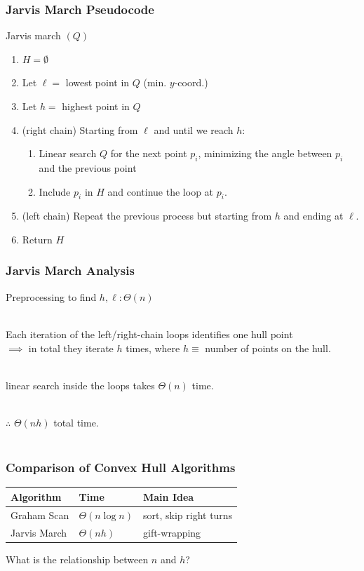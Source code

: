 \documentclass{beamer}
\newcommand{\stanza}{ \\~\ }
\begin{document}
\begin{frame} \frametitle{Jarvis March Pseudocode}
Jarvis march $(Q)$
\begin{enumerate}
  \item $H = \emptyset$
  \item Let $\ell = $ lowest point in $Q$ (min. $y$-coord.)
  \item Let $h = $ highest point in $Q$
  \item (right chain) Starting from $\ell$ and until we reach $h$:
    \begin{enumerate}
      \item Linear search $Q$ for the next point $p_i$, minimizing the angle
        between $p_i$ and the previous point
      \item Include $p_i$ in $H$ and continue the loop at $p_i$.
    \end{enumerate}
  \item (left chain) Repeat the previous process but starting from $h$ and ending at $\ell$.
  \item Return $H$
\end{enumerate}
\end{frame}

\begin{frame} \frametitle{Jarvis March Analysis}
  Preprocessing to find $h, \ell: \Theta(n)$ \stanza

  Each iteration of the left/right-chain loops identifies one hull point \\
  $\implies$ in total they iterate $h$ times,
  where $h \equiv $ number of points on the hull. \stanza

  linear search inside the loops takes $\Theta(n)$ time. \stanza

  $\therefore$ $\Theta(nh)$ total time. \stanza
\end{frame}


\begin{frame} \frametitle{Comparison of Convex Hull Algorithms}
\begin{center}
  \begin{tabular}{|l|l|l|}
    \hline
    \textbf{Algorithm} & \textbf{Time} & \textbf{Main Idea} \\ \hline
    Graham Scan & $\Theta(n \log n)$ & sort, skip right turns \\
    Jarvis March & $\Theta(nh)$ & gift-wrapping \\
    \hline
  \end{tabular}
\end{center}
\vspace{.5cm}
What is the relationship between $n$ and $h$?
\end{frame}
\end{document}
